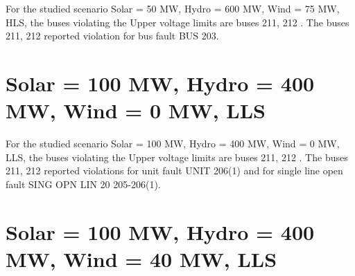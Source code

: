 \documentclass[10pt]{report}
\begin{document}
For the studied scenario Solar = 50 MW, Hydro = 600 MW, Wind = 75 MW, HLS, the buses violating the Upper voltage limits are buses 211, 212 .
The buses 211, 212 reported violation for bus fault BUS 203.
\begin{table}[H]
\caption{Contingencies reporting bus voltages greater than emergency voltage of 1.1 PU for scenario Solar = 50 MW, Hydro = 600 MW, Wind = 75 MW, HLS}
\label{HVSolar50MWHydro600MWWind75MWHLS}
\centering
{}
\end{table}

\section{Solar = 100 MW, Hydro = 400 MW, Wind = 0 MW, LLS}

For the studied scenario Solar = 100 MW, Hydro = 400 MW, Wind = 0 MW, LLS, the buses violating the Upper voltage limits are buses 211, 212 .
The buses 211, 212 reported violations for unit fault UNIT 206(1) and for single line open fault SING OPN LIN   20 205-206(1).
\begin{table}[H]
\caption{Contingencies reporting bus voltages greater than emergency voltage of 1.1 PU for scenario Solar = 100 MW, Hydro = 400 MW, Wind = 0 MW, LLS}
\label{HVSolar100MWHydro400MWWind0MWLLS}
\centering
{}
\end{table}

\section{Solar = 100 MW, Hydro = 400 MW, Wind = 40 MW, LLS}
\end{document}

